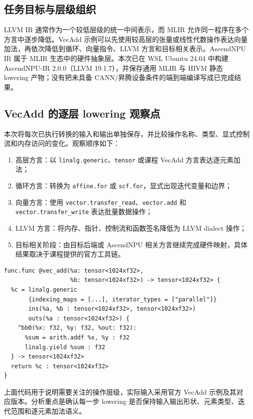 \documentclass[a4paper]{article}
\begin{document}
\subsection{任务目标与层级组织}

LLVM IR 通常作为一个较低层级的统一中间表示，而 MLIR 允许同一程序在多个方言中逐步降低\cite{mlir}。VecAdd 示例可以先使用较高层的张量或线性代数操作表达向量加法，再依次降低到循环、向量指令、LLVM 方言和目标相关表示。AscendNPU IR 属于 MLIR 生态中的硬件抽象层。本次已在 WSL Ubuntu 24.04 中构建 AscendNPU-IR 2.0.0（LLVM 19.1.7），并保存通用 MLIR 与 HIVM 静态 lowering 产物；没有把未具备 CANN/昇腾设备条件的端到端编译写成已完成结果。

\subsection{VecAdd 的逐层 lowering 观察点}

本次将每次已执行转换的输入和输出单独保存，并比较操作名称、类型、显式控制流和内存访问的变化。观察顺序如下：

\begin{enumerate}
  \item 高层方言：以 \texttt{linalg.generic}、\texttt{tensor} 或课程 VecAdd 方言表达逐元素加法；
  \item 循环方言：转换为 \texttt{affine.for} 或 \texttt{scf.for}，显式出现迭代变量和边界；
  \item 向量方言：使用 \texttt{vector.transfer\_read}、\texttt{vector.add} 和 \texttt{vector.transfer\_write} 表达批量数据操作；
  \item LLVM 方言：将内存、指针、控制流和函数签名降低为 LLVM dialect 操作；
  \item 目标相关阶段：由目标后端或 AscendNPU 相关方言继续完成硬件映射，具体结果取决于课程提供的官方工具链。
\end{enumerate}

\begin{lstlisting}[language={},caption={VecAdd 高层方言的观察示意}]
func.func @vec_add(%a: tensor<1024xf32>,
                   %b: tensor<1024xf32>) -> tensor<1024xf32> {
  %c = linalg.generic
       {indexing_maps = [...], iterator_types = ["parallel"]}
       ins(%a, %b : tensor<1024xf32>, tensor<1024xf32>)
       outs(%a : tensor<1024xf32>) {
    ^bb0(%x: f32, %y: f32, %out: f32):
      %sum = arith.addf %x, %y : f32
      linalg.yield %sum : f32
  } -> tensor<1024xf32>
  return %c : tensor<1024xf32>
}
\end{lstlisting}

上面代码用于说明需要关注的操作层级，实际输入采用官方 VecAdd 示例及其对应版本。分析重点是确认每一步 lowering 是否保持输入输出形状、元素类型、迭代范围和逐元素加法语义。
\end{document}
